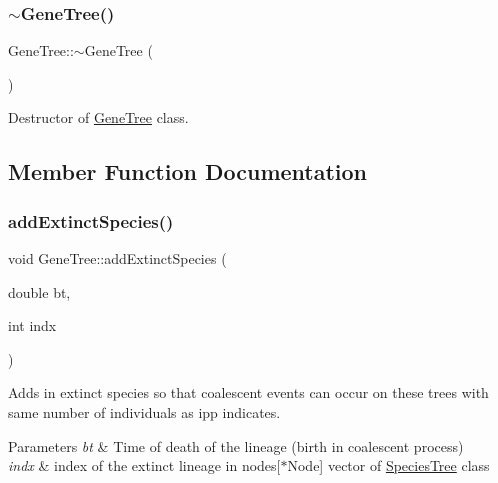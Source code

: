 \subsubsection{\texorpdfstring{$\sim$GeneTree()}{~GeneTree()}}
{\footnotesize\ttfamily Gene\+Tree\+::$\sim$\+Gene\+Tree (\begin{DoxyParamCaption}{ }\end{DoxyParamCaption})\hspace{0.3cm}{\ttfamily [virtual]}}



Destructor of \mbox{\hyperlink{class_gene_tree}{Gene\+Tree}} class. 



\subsection{Member Function Documentation}
\mbox{\label{class_gene_tree_ad79daade253cb04d531122307ca64367}} 
\subsubsection{\texorpdfstring{addExtinctSpecies()}{addExtinctSpecies()}}
{\footnotesize\ttfamily void Gene\+Tree\+::add\+Extinct\+Species (\begin{DoxyParamCaption}\item[{double}]{bt,  }\item[{int}]{indx }\end{DoxyParamCaption})}



Adds in extinct species so that coalescent events can occur on these trees with same number of individuals as ipp indicates. 


\begin{DoxyParams}{Parameters}
{\em bt} & Time of death of the lineage (birth in coalescent process) \\
\hline
{\em indx} & index of the extinct lineage in nodes\mbox{[}$\ast$\+Node\mbox{]} vector of \mbox{\hyperlink{class_species_tree}{Species\+Tree}} class \\
\hline
\end{DoxyParams}
\mbox{\label{class_gene_tree_abc2bdf64c9b4e30a6a76d0b53543bdcf}} 
